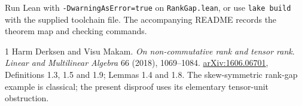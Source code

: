 \documentclass[11pt,letterpaper]{article}
\begin{document}
Run Lean with \texttt{-DwarningAsError=true} on \texttt{RankGap.lean}, or use
\texttt{lake build} with the supplied toolchain file. The accompanying
README records the theorem map and checking commands.

\begin{thebibliography}{1}
Harm Derksen and Visu Makam.
\emph{On non-commutative rank and tensor rank}.
\textit{Linear and Multilinear Algebra} 66 (2018), 1069--1084.
\href{https://arxiv.org/abs/1606.06701}{arXiv:1606.06701},
Definitions 1.3, 1.5 and 1.9; Lemmas 1.4 and 1.8.
The skew-symmetric rank-gap example is classical; the present disproof
uses its elementary tensor-unit obstruction.
\end{thebibliography}
\end{document}
